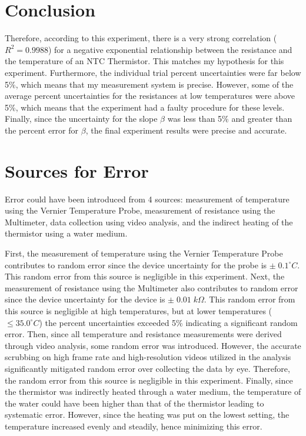 \section{Conclusion}
Therefore, according to this experiment, there is a very strong correlation ($R^2=0.9988$) for a negative exponential relationship between the resistance and the temperature of an NTC Thermistor.
This matches my hypothesis for this experiment. Furthermore, the individual trial percent uncertainties were far below 5\%, which means that my measurement system is precise. However, some of the average percent uncertainties for the resistances at low temperatures were above 5\%, which means that the experiment had a faulty procedure for these levels. Finally, since the uncertainty for the slope $\beta$ was less than 5\% and greater than the percent error for $\beta$, the final experiment results were precise and accurate.

\section{Sources for Error}
Error could have been introduced from 4 sources: measurement of temperature using the Vernier Temperature Probe, measurement of resistance using the Multimeter, data collection using video analysis, and the indirect heating of the thermistor using a water medium.

First, the measurement of temperature using the Vernier Temperature Probe contributes to random error since the device uncertainty for the probe is $\pm\;0.1^\circ C$. This random error from this source is negligible in this experiment. Next, the measurement of resistance using the Multimeter also contributes to random error since the device uncertainty for the device is $\pm\;0.01\;k\Omega$. This random error from this source is negligible at high temperatures, but at lower temperatures ($\le 35.0^\circ C$) the percent uncertainties exceeded 5\% indicating a significant random error. Then, since all temperature and resistance measurements were derived through video analysis, some random error was introduced. However, the accurate scrubbing on high frame rate and high-resolution videos utilized in the analysis significantly mitigated random error over collecting the data by eye. Therefore, the random error from this source is negligible in this experiment. Finally, since the thermistor was indirectly heated through a water medium, the temperature of the water could have been higher than that of the thermistor leading to systematic error. However, since the heating was put on the lowest setting, the temperature increased evenly and steadily, hence minimizing this error.

